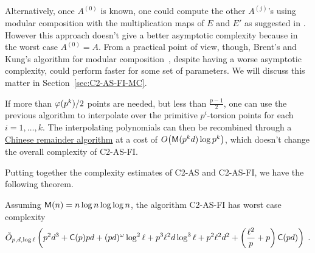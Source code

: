 Alternatively, once $A^{(0)}$ is known, one could compute the other
$A^{(j)}$'s using modular composition with the multiplication maps of
$E$ and $E'$ as suggested in \cite{couveignes96}. However this
approach doesn't give a better asymptotic complexity because in the
worst case $A^{(0)}=A$. From a practical point of view, though,
Brent's and Kung's algorithm for modular
composition~\cite{brent+kung}, despite having a worse asymptotic
complexity, could perform faster for some set of parameters. We will
discuss this matter in Section~\ref{sec:C2-AS-FI-MC}.

If more than $\varphi(p^k)/2$ points are needed, but less than
$\frac{p-1}{2}$, one can use the previous algorithm to interpolate
over the primitive $p^i$-torsion points for each $i=1,\ldots,k$. The
interpolating polynomials can then be recombined through a
\hyperref[sec:chin-rema-algor]{Chinese remainder algorithm} at a cost
of $O\bigl(\mathsf{M}(p^kd)\log p^k\bigr)$, which doesn't change the
overall complexity of C2-AS-FI.


Putting together the complexity estimates of C2-AS and C2-AS-FI, we
have the following theorem.

\begin{theorem}
  \label{th:complexity}
  Assuming $\mathsf{M}(n) = n\log n\log\log n$, the algorithm C2-AS-FI has
  worst case complexity
  \begin{equation*}
    \tilde{O}_{p,d,\log\ell}\left(
      p^2d^3 +
      \mathsf{C}(p)pd +
      (pd)^\omega\log^2\ell +
      p^3\ell^2 d\log^3\ell + 
      p^2\ell^2 d^2+
      \left(\frac{\ell^2}{p} + p\right)\mathsf{C}(pd)
    \right)
    \;\text{.}
  \end{equation*}
\end{theorem}



%
